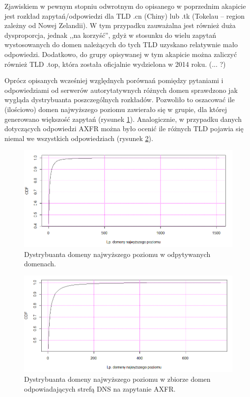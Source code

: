 Zjawiskiem w pewnym stopniu odwrotnym do opisanego w poprzednim akapicie jest rozkład zapytań/odpowiedzi dla TLD .cn (Chiny)
lub .tk (Tokelau -- region zależny od Nowej Zelandii). W tym przypadku zauważalna jest również duża dysproporcja, jednak
,,na korzyść'', gdyż w stosunku do wielu zapytań wystosowanych do domen należących do tych TLD uzyskano relatywnie mało odpowiedzi.
Dodatkowo, do grupy opisywanej w tym akapicie można zaliczyć również TLD .top, która została oficjalnie wydzielona w 2014 roku. (... ?)

Oprócz opisanych wcześniej względnych porównań pomiędzy pytaniami i odpowiedziami od serwerów autorytatywnych różnych domen
sprawdzono jak wygląda dystrybuanta poszczególnych rozkładów. Pozwoliło to oszacować ile (ilościowo) domen najwyższego poziomu
zawierało się w grupie, dla której generowano większość zapytań (rysunek \ref{cdf_tld_req}). Analogicznie, w przypadku danych
dotyczących odpowiedzi AXFR można było ocenić ile różnych TLD pojawia się niemal we wszystkich odpowiedziach (rysunek \ref{cdf_tld_resp}).

\begin{figure}[ht]
	\centering
	\includegraphics[width=1.0\textwidth]{image/cdf_tld_req_no_title}
	\caption{Dystrybuanta domeny najwyższego poziomu w odpytywanych domenach.}
	\label{cdf_tld_req}
\end{figure}

\begin{figure}[ht]
	\centering
	\includegraphics[width=1.0\textwidth]{image/cdf_tld_resp_no_title}
	\caption{Dystrybuanta domeny najwyższego poziomu w zbiorze domen odpowiadających strefą DNS na zapytanie AXFR.}
	\label{cdf_tld_resp}
\end{figure}


